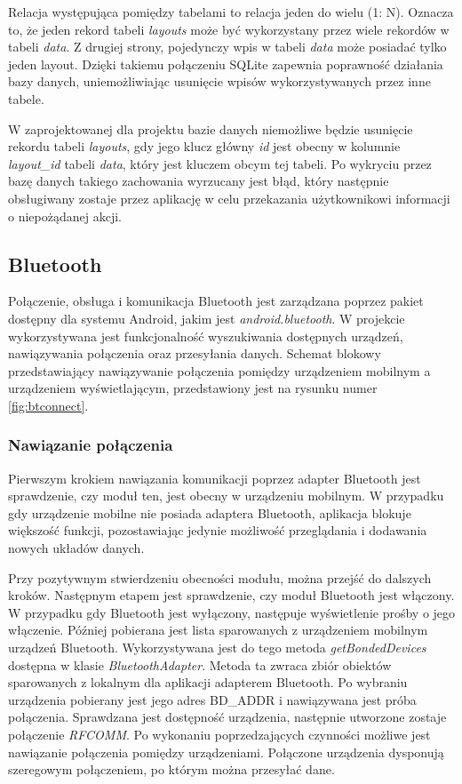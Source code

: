 \documentclass[a4paper,12pt, twoside]{article}
\begin{document}
        Relacja występująca pomiędzy tabelami to relacja jeden do wielu (1: N). Oznacza to, że jeden rekord tabeli \textit{layouts} może być wykorzystany przez wiele rekordów w tabeli \textit{data}. Z drugiej strony, pojedynczy wpis w tabeli \textit{data} może posiadać tylko jeden layout. Dzięki takiemu połączeniu SQLite zapewnia poprawność działania bazy danych, uniemożliwiając usunięcie wpisów wykorzystywanych przez inne tabele. 
        
        W zaprojektowanej dla projektu bazie danych niemożliwe będzie usunięcie rekordu tabeli \textit{layouts}, gdy jego klucz główny \textit{id} jest obecny w kolumnie \textit{layout\_id} tabeli \textit{data}, który jest kluczem obcym tej tabeli. Po wykryciu przez bazę danych takiego zachowania wyrzucany jest błąd, który następnie obsługiwany zostaje przez aplikację w celu przekazania użytkownikowi informacji o niepożądanej akcji.
    	
    	\subsection{Bluetooth}
    	Połączenie, obsługa i komunikacja Bluetooth jest zarządzana poprzez pakiet dostępny dla systemu Android, jakim jest \textit{android.bluetooth}\cite{android.bluetooth}. W projekcie wykorzystywana jest funkcjonalność wyszukiwania dostępnych urządzeń, nawiązywania połączenia oraz przesyłania danych. Schemat blokowy przedstawiający nawiązywanie połączenia pomiędzy urządzeniem mobilnym a urządzeniem wyświetlającym, przedstawiony jest na rysunku numer \ref{fig:btconnect}. 
    	
    	\subsubsection{Nawiązanie połączenia}
    	Pierwszym krokiem nawiązania komunikacji poprzez adapter Bluetooth jest sprawdzenie, czy moduł ten, jest obecny w urządzeniu mobilnym. W przypadku gdy urządzenie mobilne nie posiada adaptera Bluetooth, aplikacja blokuje większość funkcji, pozostawiając jedynie możliwość przeglądania i dodawania nowych układów danych. 
    	
    	Przy pozytywnym stwierdzeniu obecności modułu, można przejść do dalszych kroków. Następnym etapem jest sprawdzenie, czy moduł Bluetooth jest włączony. W przypadku gdy Bluetooth jest wyłączony, następuje wyświetlenie prośby o jego włączenie. Później pobierana jest lista sparowanych z urządzeniem mobilnym urządzeń Bluetooth. Wykorzystywana jest do tego metoda \textit{getBondedDevices}\cite{bonded} dostępna w klasie \textit{BluetoothAdapter}. Metoda ta zwraca zbiór obiektów sparowanych z lokalnym dla aplikacji adapterem Bluetooth. Po wybraniu urządzenia pobierany jest jego adres BD\_ADDR i nawiązywana jest próba połączenia. Sprawdzana jest dostępność urządzenia, następnie utworzone zostaje połączenie \textit{RFCOMM}\cite{rfcomm}. Po wykonaniu poprzedzających czynności możliwe jest nawiązanie połączenia pomiędzy urządzeniami. Połączone urządzenia dysponują szeregowym połączeniem, po którym można przesyłać dane.
    	
\end{document}

